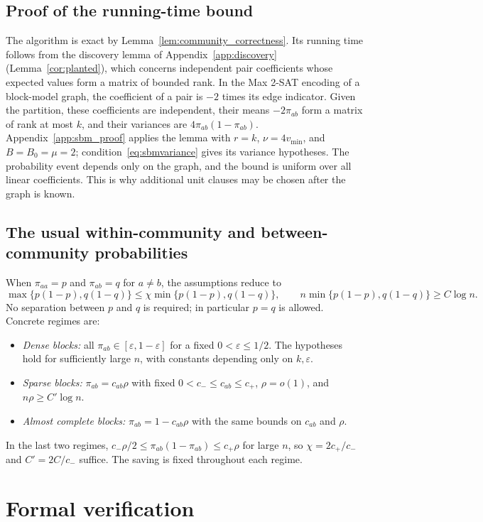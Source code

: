 \documentclass[11pt,a4paper]{article}
\theoremstyle{definition}
\theoremstyle{remark}
\begin{document}
\subsection{Proof of the running-time bound}

The algorithm is exact by Lemma~\ref{lem:community_correctness}. Its
running time follows from the discovery lemma of
Appendix~\ref{app:discovery} (Lemma~\ref{cor:planted}), which concerns
independent pair coefficients whose expected values form a matrix of
bounded rank. In the Max 2-SAT encoding of a block-model graph, the
coefficient of a pair is $-2$ times its edge indicator. Given the
partition, these coefficients are independent, their means $-2\pi_{ab}$
form a matrix of rank at most $k$, and their variances are
$4\pi_{ab}(1-\pi_{ab})$. Appendix~\ref{app:sbm_proof} applies the lemma with
$r=k$, $\nu=4v_{\min}$, and $B=B_0=\mu=2$; condition~\eqref{eq:sbmvariance}
gives its variance hypotheses. The probability event depends only on the
graph, and the bound is uniform over all linear coefficients. This is why
additional unit clauses may be chosen after the graph is known.

\subsection{The usual within-community and between-community probabilities}
When $\pi_{aa}=p$ and $\pi_{ab}=q$ for $a\ne b$, the assumptions reduce to
\[
 \max\{p(1-p),q(1-q)\}\le\chi\min\{p(1-p),q(1-q)\},\qquad
 n\min\{p(1-p),q(1-q)\}\ge C\log n.
\]
No separation between $p$ and $q$ is required; in particular $p=q$ is
allowed. Concrete regimes are:
\begin{itemize}
\item \emph{Dense blocks:} all $\pi_{ab}\in[\varepsilon,1-\varepsilon]$ for
a fixed $0<\varepsilon\le1/2$. The hypotheses hold for sufficiently large
$n$, with constants depending only on $k,\varepsilon$.
\item \emph{Sparse blocks:} $\pi_{ab}=c_{ab}\rho$ with fixed
$0<c_-\le c_{ab}\le c_+$, $\rho=o(1)$, and $n\rho\ge C'\log n$.
\item \emph{Almost complete blocks:} $\pi_{ab}=1-c_{ab}\rho$ with the
same bounds on $c_{ab}$ and $\rho$.
\end{itemize}
In the last two regimes, $c_-\rho/2\le\pi_{ab}(1-\pi_{ab})\le c_+\rho$ for
large $n$, so $\chi=2c_+/c_-$ and $C'=2C/c_-$ suffice. The saving is fixed
throughout each regime.


\section{Formal verification}\label{sec:verification}
\end{document}
